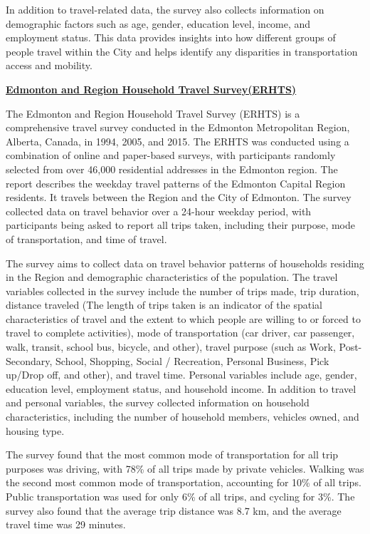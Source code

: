\documentclass[
11pt, %
oneside, %
english, %
singlespacing, %
]{macthesis} %
\begin{document}
In addition to travel-related data, the survey also collects information on demographic factors such as age, gender, education level, income, and employment status. This data provides insights into how different groups of people travel within the City and helps identify any disparities in transportation access and mobility.

\textbf{\href{https://www.edmonton.ca/transportation/traffic_reports/travel-pattern-analysis}{Edmonton and Region Household Travel Survey(ERHTS)}}

The Edmonton and Region Household Travel Survey (ERHTS) is a comprehensive travel survey conducted in the Edmonton Metropolitan Region, Alberta, Canada, in 1994, 2005, and 2015. The ERHTS was conducted using a combination of online and paper-based surveys, with participants randomly selected from over 46,000 residential addresses in the Edmonton region. The report describes the weekday travel patterns of the Edmonton Capital Region residents. It travels between the Region and the City of Edmonton. The survey collected data on travel behavior over a 24-hour weekday period, with participants being asked to report all trips taken, including their purpose, mode of transportation, and time of travel.

The survey aims to collect data on travel behavior patterns of households residing in the Region and demographic characteristics of the population. The travel variables collected in the survey include the number of trips made, trip duration, distance traveled (The length of trips taken is an indicator of the spatial characteristics of travel and the extent to which people are willing to or forced to travel to complete activities), mode of transportation (car driver, car passenger, walk, transit, school bus, bicycle, and other), travel purpose (such as Work, Post-Secondary, School, Shopping, Social / Recreation, Personal Business, Pick up/Drop off, and other), and travel time. Personal variables include age, gender, education level, employment status, and household income. In addition to travel and personal variables, the survey collected information on household characteristics, including the number of household members, vehicles owned, and housing type.

The survey found that the most common mode of transportation for all trip purposes was driving, with 78\% of all trips made by private vehicles. Walking was the second most common mode of transportation, accounting for 10\% of all trips. Public transportation was used for only 6\% of all trips, and cycling for 3\%. The survey also found that the average trip distance was 8.7 km, and the average travel time was 29 minutes.
\end{document}
